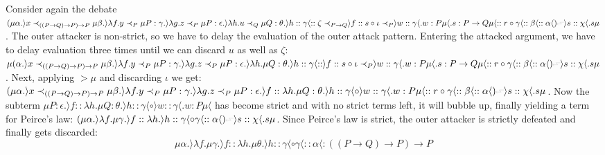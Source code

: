 \documentclass{IOS-Book-Article}
\begin{document}
\begin{example}
  Consider again the debate  $(\mu \alpha.\rangle x \prec_{((P\rightarrow Q)\rightarrow P)\rightarrow P} \mu \beta. \rangle \lambda f. y \prec_P \mu P:\gamma.\rangle \lambda g. z \prec_P \mu P:\epsilon.\rangle \lambda h. u \prec_Q \mu Q:\theta.\rangle h :: \gamma \langle :: \zeta \prec_{P\rightarrow Q} \rangle f :: s \circ \iota \prec_P \rangle w :: \gamma \langle. w:P \mu \langle. s:P \rightarrow Q \mu \langle :: r \circ \gamma \langle :: \beta\langle
  :: \alpha\langle)\leftattack \rangle s :: \chi \langle.s\mu$.
The outer attacker is non-strict, so we have to delay the evaluation of the outer attack pattern. %
 Entering the attacked argument, we have to delay evaluation three times until we can discard $u$ as well as $\zeta$: $ \mu (\alpha.\rangle x \prec_{((P\rightarrow Q)\rightarrow P)\rightarrow P} \mu \beta. \rangle \lambda f. y \prec_P \mu P:\gamma.\rangle \lambda g. z \prec_P \mu P:\epsilon.\rangle \lambda h.\mu Q:\theta.\rangle h :: \gamma \langle :: \rangle f :: s \circ \iota \prec_P \rangle w :: \gamma \langle. w:P \mu \langle. s:P \rightarrow Q \mu \langle :: r \circ \gamma \langle :: \beta\langle
  :: \alpha\langle) \leftattack \rangle s :: \chi \langle.s\mu$.
Next, applying $> \mu$ and discarding $\iota$ we get:  $ (\mu \alpha.\rangle x \prec_{((P\rightarrow Q)\rightarrow P)\rightarrow P} \mu \beta. \rangle \lambda f. y \prec_P \mu P:\gamma.\rangle \lambda g. z \prec_P \mu P:\epsilon.\rangle f :: \lambda h.\mu Q:\theta.\rangle h :: \gamma \langle \circ \rangle w :: \gamma \langle. w:P \mu \langle :: r \circ \gamma \langle :: \beta\langle
   :: \alpha\langle) \leftattack \rangle s :: \chi \langle.s\mu$.
 Now the subterm $\mu P:\epsilon.\rangle f :: \lambda h.\mu Q:\theta.\rangle h :: \gamma \langle \circ \rangle w :: \gamma \langle. w:P \mu \langle$ has become strict and with no strict terms left, it will bubble up, finally yielding a term for Peirce's law: $(\mu \alpha.\rangle \lambda f.\mu \gamma. \rangle f :: \lambda h.\rangle h :: \gamma \langle\circ\gamma\langle:: \alpha\langle)  \leftattack \rangle s :: \chi \langle.s\mu$.
Since Peirce's law is strict, the outer attacker is strictly defeated and finally gets discarded:
 \[\mu \alpha.\rangle \lambda f.\mu \gamma. \rangle f :: \lambda h.\mu \theta.\rangle h :: \gamma \langle\circ\gamma\langle:: \alpha\langle:((P\rightarrow Q)\rightarrow P)\rightarrow P\]
\end{example}
\end{document}
